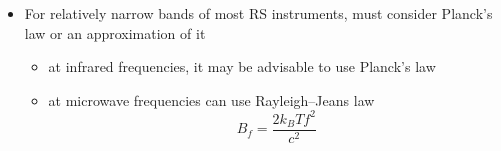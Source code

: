\documentclass[11pt, oneside]{article}
\begin{document}
\begin{itemize}
\begin{itemize}
\begin{equation}
		\end{equation}
		(non-polarized, i.e., dual-polarization, antenna, $c_p = 1$ in Eq.~\eqref{e:P}; a single-polarization antenna receives half)\\
		where
		\begin{equation*}
			\sigma_\mathrm{SB} \equiv \text{Stefan--Boltzmann const} = 5.67\times10^{-8}\left[\frac{\text{W}}{\text{m}^2\text{K}^4}\right]
		\end{equation*}
		\item[$\bigstar$] But be careful, some RS instruments have narrow bandwidths $\Rightarrow$ Stefan--Boltzmann may not apply
	\end{itemize}
	\item For relatively narrow bands of most RS instruments, must consider Planck's law or an approximation of it
	\begin{itemize}
		\item[$\rightarrow$] at infrared frequencies, it may be advisable to use Planck's law
		\item[$\rightarrow$] at microwave frequencies can use Rayleigh--Jeans law
		\begin{equation}
			\label{e:RJ}
			B_f = \frac{2k_BTf^2}{c^2}
		\end{equation}
	\end{itemize}
\end{itemize}
\end{document}

